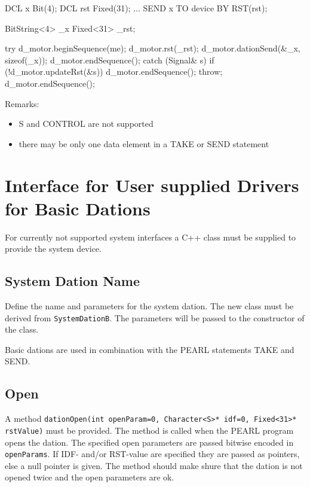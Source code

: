 \begin{PEARLCode}
DCL x Bit(4);
DCL rst Fixed(31);
...
SEND x TO device BY RST(rst);
\end{PEARLCode}

\begin{CppCode}
BitString<4> _x
Fixed<31> _rst;

try {
   d_motor.beginSequence(me);
   d_motor.rst(_rst);
   d_motor.dationSend(&_x, sizeof(_x));
   d_motor.endSequence();
} catch (Signal& s) {
   if (!d_motor.updateRst(&s)) {
      d_motor.endSequence();
      throw;
   }
   d_motor.endSequence();
}
\end{CppCode}


Remarks:
\begin{itemize}
\item S and CONTROL are not supported
\item there may be only one data element in a TAKE or SEND statement
\end{itemize}

\section{Interface for User supplied Drivers for Basic Dations}
For currently not supported system interfaces a C++ class must be supplied to 
provide the system device.

\subsection{System Dation Name}
Define the name and parameters for the system dation.
The new class must be derived from \verb|SystemDationB|.
The parameters will be passed to the constructor of the class.

Basic dations are used in combination with the PEARL statements TAKE and
SEND.

\subsection{Open}
A method \verb|dationOpen(int openParam=0, Character<S>* idf=0, Fixed<31>* rstValue)|
must be provided.
The method is called when the PEARL program opens the dation.
The specified open parameters are passed bitwise encoded in \verb|openParams|.
If IDF- and/or RST-value are specified they are passed as pointers, else
a null pointer is given.
The method should make shure that the dation is not opened twice and
the open parameters are ok.

